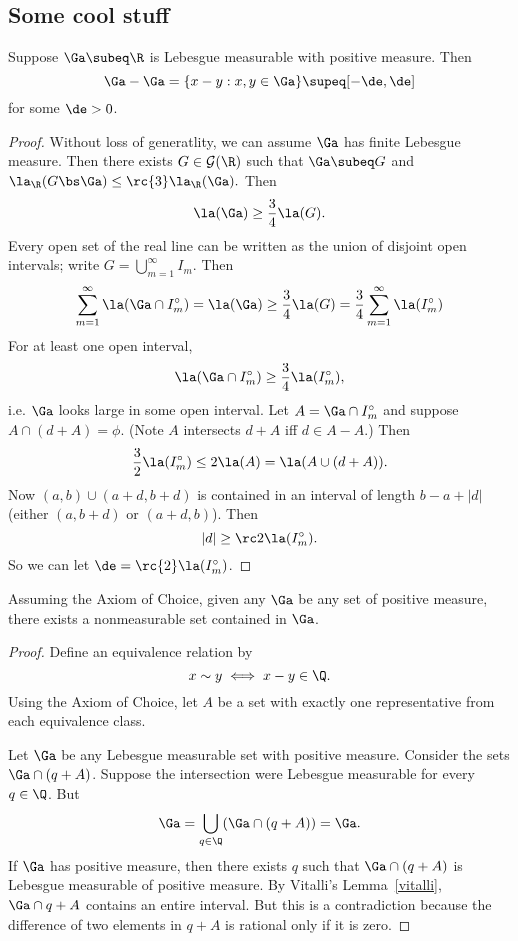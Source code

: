 
\subsection{Some cool stuff}
\begin{lem}[Vitalli]\label{vitalli}%
Suppose $\Ga\subeq \R$ is Lebesgue measurable with positive measure. Then 
\[
\Ga-\Ga=\{x-y:x,y\in \Ga\}\supeq [-\de,\de]
\]
for some $\de>0$.
\end{lem}
\begin{proof}
Without loss of generatlity, we can assume $\Ga$ has finite Lebesgue measure. Then there exists $G\in \cal G(\R)$ such that $\Ga\subeq G$ and 
$
\la_{\R}(G\bs \Ga)\leq \rc{3}\la_{\R}(\Ga).
$
Then 
\[\la(\Ga)\geq \frac{3}{4}\la(G).\]
Every open set of the real line can be written as the union of disjoint open intervals; write $G=\bigcup_{m=1}^{\infty} I_m$. Then
\[
\sum_{m=1}^{\infty} \la(\Ga\cap I_m^{\circ})
=\la(\Ga)\geq \frac{3}{4}\la(G)=\frac 34 \sum_{m=1}^{\infty} \la(I_m^{\circ})
\]
For at least one open interval,
\[
\la(\Ga\cap I_m^{\circ})\geq \frac 34
\la(I_m^{\circ}),
\]
i.e. $\Ga$ looks large in some open interval. Let $A=\Ga\cap I_m^{\circ}$ and suppose $A\cap (d+A)=\phi$. (Note $A$ intersects $d+A$ iff $d\in A-A$.) Then
\[
\frac 32 \la(I_m^{\circ})
\leq
2\la(A)=\la(A\cup (d+A)).
\]
Now $(a,b) \cup(a+d,b+d)$ is contained in an interval of length $b-a+|d|$ (either $(a,b+d)$ or $(a+d,b)$). Then
\[
|d|\geq \rc 2 \la(I_m^{\circ}).
\]
So we can let $\de=\rc{2}\la(I_m^{\circ})$.
\end{proof}
\begin{thm}
Assuming the Axiom of Choice, given any $\Ga$ be any set of positive measure, there exists a nonmeasurable set contained in $\Ga$.
\end{thm}
\begin{proof}
Define an equivalence relation by
\[
x\sim y\iff x-y\in \Q.
\]
Using the Axiom of Choice, let $A$ be a set with exactly one representative from each equivalence class.

Let $\Ga$ be any Lebesgue measurable set with positive measure. Consider the sets $\Ga\cap (q+A)$. Suppose the intersection were Lebesgue measurable for every $q\in \Q$. But
\[
\Ga=\bigcup_{q\in \Q} (\Ga\cap(q+A))=\Ga.
\]
If $\Ga$ has positive measure, then there exists $q$ such that $\Ga\cap (q+A)$ is Lebesgue measurable of positive measure. By Vitalli's Lemma~\ref{vitalli}, $\Ga\cap q+A$ contains an entire interval. But this is a contradiction because the difference of two elements in $q+A$ is rational only if it is zero.
\end{proof}
